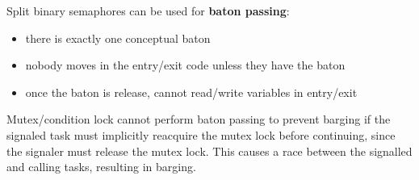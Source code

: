 \documentclass[11pt]{article}
\begin{document}
Split binary semaphores can be used for \textbf{baton passing}:
\begin{itemize}
\item there is exactly one conceptual baton
\item nobody moves in the entry/exit code unless they have the baton
\item once the baton is release, cannot read/write variables in entry/exit
\end{itemize}

Mutex/condition lock cannot perform baton passing to prevent barging if the signaled task
must implicitly reacquire the mutex lock before continuing, since the signaler must release
the mutex lock.
This causes a race between the signalled and calling tasks, resulting in barging.
\end{document}
